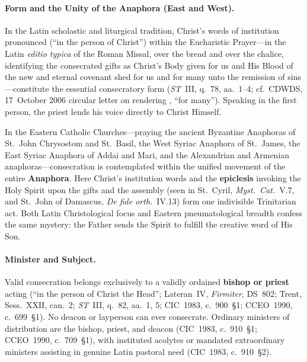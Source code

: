 \paragraph{Form and the Unity of the Anaphora (East and West).}
In the Latin scholastic and liturgical tradition, Christ's words of institution pronounced  (``in the person of Christ'') within the Eucharistic Prayer---in the Latin \emph{editio typica} of the Roman Missal,  over the bread and  over the chalice, identifying the consecrated gifts as Christ's Body given for us and His Blood of the new and eternal covenant shed for us and for many unto the remission of sins---constitute the essential consecratory form (\emph{ST}~III, q.~78, aa.~1--4; cf.~CDWDS, 17~October 2006 circular letter on rendering , ``for many''). Speaking in the first person, the priest lends his voice directly to Christ Himself.

In the Eastern Catholic Churches---praying the ancient Byzantine Anaphoras of St.~John Chrysostom and St.~Basil, the West Syriac Anaphora of St.~James, the East Syriac Anaphora of Addai and Mari, and the Alexandrian and Armenian anaphoras---consecration is contemplated within the unified movement of the entire \textbf{Anaphora}. Here Christ's institution words and the \textbf{epiclesis} invoking the Holy Spirit upon the gifts and the assembly (seen in St.~Cyril, \emph{Myst.~Cat.}~V.7, and St.~John of Damascus, \emph{De fide orth.}~IV.13) form one indivisible Trinitarian act. Both Latin Christological focus and Eastern pneumatological breadth confess the same mystery: the Father sends the Spirit to fulfill the creative word of His Son.

\paragraph{Minister and Subject.}
Valid consecration belongs exclusively to a validly ordained \textbf{bishop or priest} acting  (``in the person of Christ the Head''; Lateran~IV, \emph{Firmiter}, DS~802; Trent, Sess.~XXII, can.~2; \emph{ST}~III, q.~82, aa.~1, 5; CIC~1983, c.~900~\S1; CCEO~1990, c.~699~\S1). No deacon or layperson can ever consecrate. Ordinary ministers of distribution are the bishop, priest, and deacon (CIC~1983, c.~910~\S1; CCEO~1990, c.~709~\S1), with instituted acolytes or mandated extraordinary ministers assisting in genuine Latin pastoral need (CIC~1983, c.~910~\S2).

